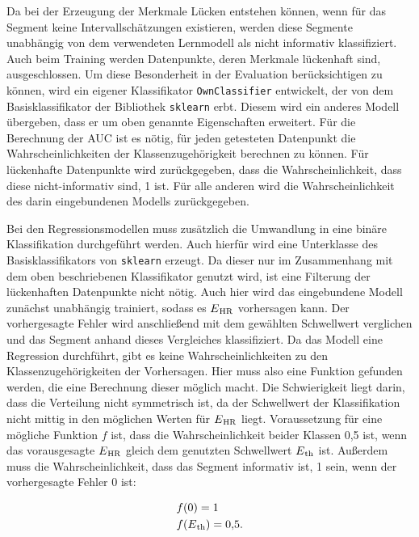 Da bei der Erzeugung der Merkmale Lücken entstehen können, wenn für das Segment keine Intervallschätzungen existieren, werden diese Segmente unabhängig von dem verwendeten Lernmodell als nicht informativ klassifiziert. Auch beim Training werden Datenpunkte, deren Merkmale lückenhaft sind, ausgeschlossen. Um diese Besonderheit in der Evaluation berücksichtigen zu können, wird ein eigener Klassifikator \texttt{OwnClassifier} entwickelt, der von dem Basisklassifikator der Bibliothek \texttt{sklearn} erbt. Diesem wird ein anderes Modell übergeben, dass er um oben genannte Eigenschaften erweitert. Für die Berechnung der \ac{AUC} ist es nötig, für jeden getesteten Datenpunkt die Wahrscheinlichkeiten der Klassenzugehörigkeit berechnen zu können. Für lückenhafte Datenpunkte wird zurückgegeben, dass die Wahrscheinlichkeit, dass diese nicht-informativ sind, 1 ist. Für alle anderen wird die Wahrscheinlichkeit des darin eingebundenen Modells zurückgegeben.%

Bei den Regressionsmodellen muss zusätzlich die Umwandlung in eine binäre Klassifikation durchgeführt werden.  Auch hierfür wird eine Unterklasse des Basisklassifikators von \texttt{sklearn} erzeugt. Da dieser nur im Zusammenhang mit dem oben beschriebenen Klassifikator genutzt wird, ist eine Filterung der lückenhaften Datenpunkte nicht nötig. Auch hier wird das eingebundene Modell zunächst unabhängig trainiert, sodass es $E\textsubscript{HR}$ vorhersagen kann. Der vorhergesagte Fehler wird anschließend mit dem gewählten Schwellwert verglichen und das Segment anhand dieses Vergleiches klassifiziert. Da das Modell eine Regression durchführt, gibt es keine Wahrscheinlichkeiten zu den Klassenzugehörigkeiten der Vorhersagen. Hier muss also eine Funktion gefunden werden, die eine Berechnung dieser möglich macht. Die Schwierigkeit liegt darin, dass die Verteilung nicht symmetrisch ist, da der Schwellwert der Klassifikation nicht mittig in den möglichen Werten für $E\textsubscript{HR}$ liegt. Voraussetzung für eine mögliche Funktion $f$ ist, dass die Wahrscheinlichkeit beider Klassen 0,5 ist, wenn das vorausgesagte $E\textsubscript{HR}$ gleich dem genutzten Schwellwert $E\textsubscript{th}$ ist. Außerdem muss die Wahrscheinlichkeit, dass das Segment informativ ist, 1 sein, wenn der vorhergesagte Fehler 0 ist:

\begin{align*}
	&f(0) = 1\\
	&f(E\textsubscript{th}) = 0{,}5\text{.}
\end{align*}


